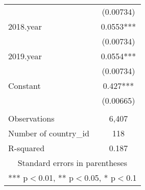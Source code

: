 \documentclass[]{article}
\begin{document}
\begin{tabular}{lc}
 & (0.00734) \\
2018.year & 0.0553*** \\
 & (0.00734) \\
2019.year & 0.0554*** \\
 & (0.00734) \\
Constant & 0.427*** \\
 & (0.00665) \\
 &  \\
Observations & 6,407 \\
Number of country\_id & 118 \\
 R-squared & 0.187 \\ \hline
\multicolumn{2}{c}{ Standard errors in parentheses} \\
\multicolumn{2}{c}{ *** p$<$0.01, ** p$<$0.05, * p$<$0.1} \\
\end{tabular}
\end{document}

